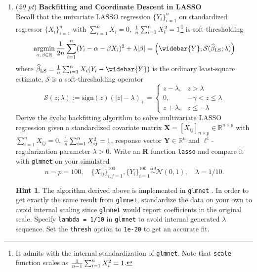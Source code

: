 \documentclass[10pt]{article}
\theoremstyle{definition}
\newtheorem*{hint}{Hint}
\theoremstyle{remark}
\newcommand{\Xb}{\mathbf{X}}
\newcommand{\bY}{\bm{Y}}
\newcommand{\bbR}{\mathbb{R}}
\newcommand{\cN}{\mathcal{N}}
\newcommand{\cS}{\mathcal{S}}
\newcommand{\argmin}{\mathop{\mathrm{argmin}}}
\newcommand{\sign}{\mathrm{sign}}	%
\newcommand{\LS}{\mathrm{LS}}		%
\begin{document}
\begin{enumerate}
	\item (\textit{20 pt}) \textbf{Backfitting and Coordinate Descent in LASSO \citep{wu2008coordinate,friedman2010regularization}}\\
	Recall that the univariate LASSO regression $ \{ Y_{i} \}_{i=1}^{n} $ on standardized regressor $ \{ X_{i} \}_{i=1}^{n} $ with $ \sum_{i=1}^{n}X_{i} = 0 $, $ {1 \over n}\sum_{i=1}^{n}X_{i}^{2} = 1 $\footnote{It admits with the internal standardization of \texttt{glmnet}. Note that \texttt{scale} function scales as $ {1 \over n-1}\sum_{i=1}^{n}X_{i}^{2} = 1 $.} is soft-thresholding
	\[ \argmin_{\alpha,\beta \in \bbR} {1 \over 2n}\sum_{i=1}^{n}(Y_{i} - \alpha - \beta X_{i})^{2} + \lambda |\beta| = \left( \widebar{Y}, \cS( \widehat{\beta}_{\LS}; \lambda) \right) \]
	where $ \widehat{\beta}_{\LS} = {1 \over n}\sum_{i=1}^{n}X_{i}(Y_{i} - \widebar{Y}) $ is the ordinary least-square estimate, $ \cS $ is a soft-thresholding operator
	\[ \cS(z;\lambda) := \sign(z)(|z| - \lambda)_{+} = \begin{cases}
	z-\lambda, & z > \lambda\\
	0, & -\gamma < z \le \lambda\\
	z+\lambda, & z \le -\lambda
	\end{cases} \]
	Derive the cyclic backfitting algorithm to solve multivariate LASSO regression given a standardized covariate matrix $ \Xb = [X_{ij}]_{n\times p} \in \bbR^{n\times p} $ with $ \sum_{i=1}^{n}X_{ij} = 0 $, $ {1 \over n}\sum_{i=1}^{n}X_{ij}^{2} = 1 $, response vector $ \bY \in \bbR^{n} $ and $ \ell^{1} $-regularization parameter $ \lambda > 0 $. Write an \textbf{R} function \texttt{lasso} and compare it with \texttt{glmnet} on your simulated
	\[ n=p=100, \quad \{X_{ij}\}_{i,j=1}^{100},\{Y_{i}\}_{i=1}^{100}\overset{iid}{\sim}\cN(0,1), \quad \lambda = 1/10. \]
	
	\begin{hint}
		The algorithm derived above is implemented in \texttt{glmnet} \citep{friedman2010regularization}. In order to get exactly the same result from \texttt{glmnet}, standardize the data on your own to avoid internal scaling since \texttt{glmnet} would report coefficients in the original scale. Specify \texttt{lambda = 1/10} in \texttt{glmnet} to avoid internal generated $\lambda$ sequence. Set the \texttt{thresh} option to \texttt{1e-20} to get an accurate fit.
	\end{hint}
	

\end{enumerate}
\end{document}
